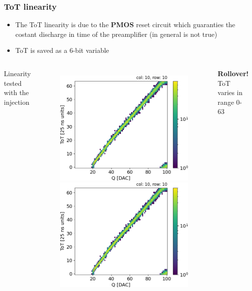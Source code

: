     \begin{frame}
        \frametitle{ToT linearity}
        \begin{itemize}
            \item The ToT linearity is due to the \textbf{PMOS} reset circuit which guaranties the costant discharge in time of the preamplifier (in general is not true)
            \item ToT is saved as a 6-bit variable
        \end{itemize}
        \medskip
        \medskip
        \medskip
        \begin{columns}
                \centering
                Linearity tested with the injection
                \begin{figure}[h!]
                    \includegraphics[width=.49\linewidth]{figures/charaterization/ToT_rollover.png}
                    \includegraphics[width=.49\linewidth]{figures/charaterization/ToT_rollover.png} 
                \end{figure}
                \textbf{Rollover!}\\
                ToT varies in range 0-63

        \end{columns}


    \end{frame}    

